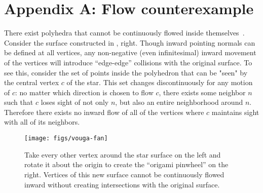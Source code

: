 \section*{Appendix A: Flow counterexample}
%
\label{app:counterexample}
%
There exist polyhedra that cannot be continuously flowed inside
themselves~\cite{Mathoverflow:206750}.
%
Consider the surface constructed in , right. Though inward
pointing normals can be defined at all vertices, any non-negative (even
infinitesimal) inward movement of the vertices will introduce ``edge-edge''
collisions with the original surface.
%
To see this, consider the set of points inside the polyhedron that can be
"seen" by the central vertex $c$ of the star. This set changes discontinuously
for any motion of $c$: no matter which direction is chosen to flow $c$, there
exists some neighbor $n$ such that $c$ loses sight of not only $n$, but also an
entire neighborhood around $n$. Therefore there exists no inward flow of all of
the vertices where $c$ maintains sight with all of its neighbors.
\begin{figure}[hb]
\texttt{[image: figs/vouga-fan]}
\caption{Take every other vertex around the star surface on the left and
rotate it about the origin to create the ``origami pinwheel'' on the right.
Vertices of this new surface cannot be continuously flowed inward without
creating intersections with the original surface.}
\label{fig:vouga-fan}
\end{figure}
